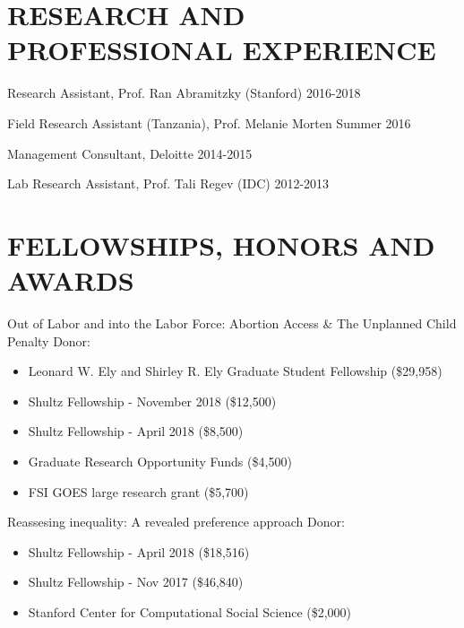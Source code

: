 \documentclass[margin]{res} %
\begin{document}
\begin{resume}
 
\section{RESEARCH AND PROFESSIONAL EXPERIENCE}
 Research Assistant, Prof. Ran Abramitzky (Stanford) \hfill 2016-2018

 Field Research Assistant (Tanzania), Prof. Melanie Morten \hfill Summer 2016
 
 Management Consultant, Deloitte \hfill 2014-2015 

 Lab Research Assistant, Prof. Tali Regev (IDC) \hfill 2012-2013


\section{FELLOWSHIPS, HONORS AND AWARDS}

Out of Labor and into the Labor Force: Abortion Access \& The Unplanned Child Penalty
Donor: 
\begin{itemize}
	\item Leonard W. Ely and Shirley R. Ely Graduate Student Fellowship (\$29,958)
	\item Shultz Fellowship - November 2018 (\$12,500)
    \item Shultz Fellowship - April 2018 (\$8,500)
    \item Graduate Research Opportunity Funds (\$4,500)
    \item FSI GOES large research grant (\$5,700)
\end{itemize}	

Reassesing inequality: A revealed preference approach
Donor: 
\begin{itemize}
	\item Shultz Fellowship - April 2018 (\$18,516)
	\item Shultz Fellowship - Nov 2017 (\$46,840)
	\item Stanford Center for Computational Social Science (\$2,000) 
\end{itemize}	


\end{resume}
\end{document}
